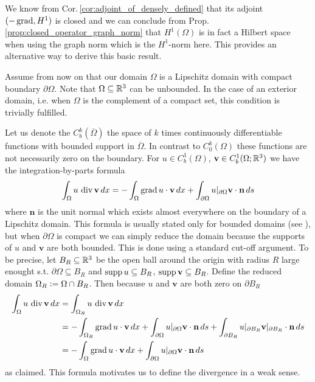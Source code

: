 \documentclass[../main.tex]{subfiles}
\begin{document}
We know from Cor.\,\ref{cor:adjoint_of_densely_defined} 
that its adjoint $(-\operatorname{grad}, H^1)$ is closed and 
we can conclude from Prop.\,\ref{prop:closed_operator_graph_norm} 
that $H^1(\Omega)$ is in fact a Hilbert space 
when using the graph norm which is the $H^1$-norm here. This provides an alternative 
way to derive this basic result.

Assume from now on that our domain $\Omega$ is a Lipschitz domain 
with compact boundary $\partial \Omega$. Note that $\Omega \subseteq \mathbb{R}^3$ 
can be unbounded. In the case of an exterior domain, i.e. when $\Omega$ is 
the complement of a compact set, this condition is trivially fulfilled.

Let us denote the $C^k_b(\overline{\Omega})$ the space of $k$ times continuously
differentiable functions with bounded support in $\overline{\Omega}$. 
In contrast to $C^k_0(\Omega)$ these functions are not necessarily zero on the 
boundary.
For $u \in C_b^1(\Omega)$, $\mathbf{v} \in C_b^1(\Omega;\mathbb{R}^3)$ we 
have the integration-by-parts formula
\begin{align}
    \int_\Omega u \, \operatorname{div} \mathbf{v} \, dx
    = - \int_\Omega \operatorname{grad} u \cdot \mathbf{v} \, dx
        + \int_{\partial \Omega} u|_{\partial \Omega} \mathbf{v}\cdot\mathbf{n} \, ds
        \label{eq:integration_by_parts_C1}
\end{align}
where $\mathbf{n}$ is the unit normal which exists almost everywhere on the boundary of a 
Lipschitz domain. This formula is usually stated only for 
bounded domains (see \cite[Cor.\,3.20]{monk}), but when $\partial \Omega$ is compact 
we can simply reduce the domain 
because the supports of $u$ and $\mathbf{v}$ are both bounded. This is done using 
a standard cut-off argument.
To be precise, let $B_R \subseteq \mathbb{R}^3$ be the open ball around the origin 
with radius $R$ large enought s.t. $\partial \Omega \subseteq B_R$ and 
$\operatorname{supp} u \subseteq B_R$, $\operatorname{supp} \mathbf{v} \subseteq B_R$.
Define the reduced domain $\Omega_R \vcentcolon= \Omega \cap B_R$. 
Then because $u$ and $\mathbf{v}$ are both zero on $\partial B_R$
\begin{align*}
    \int_\Omega u \, \operatorname{div} \mathbf{v} \, dx
    &= \int_{\Omega_R} u \, \operatorname{div} \mathbf{v} \, dx
    \\ &= - \int_{\Omega_R} \operatorname{grad} u \cdot \mathbf{v} \, dx
        + \int_{\partial \Omega} u|_{\partial \Omega} \mathbf{v}\cdot\mathbf{n} \, ds
        + \int_{\partial B_R} u|_{\partial B_R} \mathbf{v}|_{\partial B_R} \cdot\mathbf{n} \, ds
    \\ &= - \int_\Omega \operatorname{grad} u \cdot \mathbf{v} \, dx
        + \int_{\partial \Omega} u|_{\partial \Omega} \mathbf{v}\cdot\mathbf{n} \, ds
\end{align*}
as claimed. This formula motivates us to define the divergence in a
weak sense.
\end{document}

